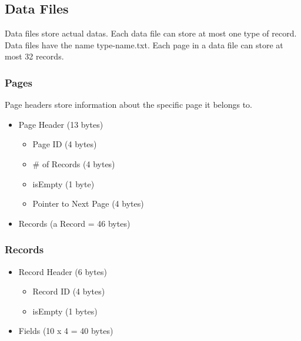 \documentclass[12pt,a4paper]{article}
\begin{document}
    \subsection{Data Files}
       Data files store actual datas. Each data file can store at most one type of record. Data files have the name type-name.txt. Each page in a data file can store at most 32 records. 
        \subsubsection{Pages}
            Page headers store information about the specific page it belongs to.
            \begin{itemize}
              \item Page Header (13 bytes)
                \begin{itemize}
                     \item Page ID (4 bytes)
                     \item \# of Records (4 bytes)
                     \item isEmpty (1 byte)
                     \item Pointer to Next Page (4 bytes)
                \end{itemize}
              \item Records (a Record = 46 bytes)
            \end{itemize}
        \subsubsection{Records}
            \begin{itemize}
              \item Record Header (6 bytes)
                \begin{itemize}
                     \item Record ID (4 bytes)
                    \item isEmpty (1 bytes)
                \end{itemize}
              \item Fields (10 x 4 = 40 bytes)
            \end{itemize}
\end{document}
